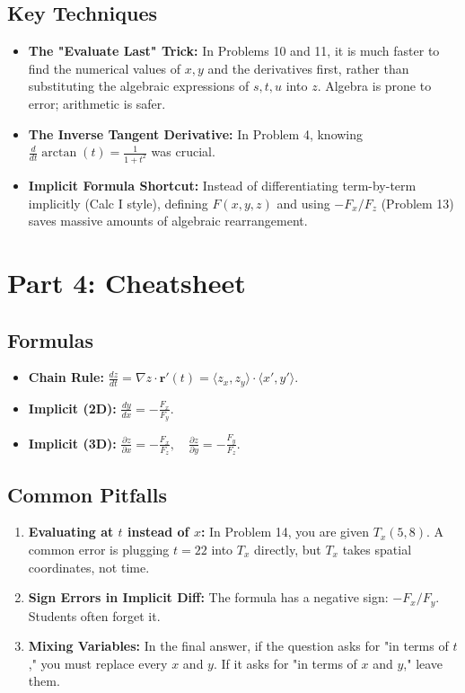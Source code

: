 \documentclass[11pt, letterpaper]{article}
\theoremstyle{definition}
\begin{document}
\subsection{Key Techniques}
\begin{itemize}
    \item \textbf{The "Evaluate Last" Trick:} In Problems 10 and 11, it is much faster to find the numerical values of $x, y$ and the derivatives first, rather than substituting the algebraic expressions of $s,t,u$ into $z$. Algebra is prone to error; arithmetic is safer.
    \item \textbf{The Inverse Tangent Derivative:} In Problem 4, knowing $\frac{d}{dt}\arctan(t) = \frac{1}{1+t^2}$ was crucial.
    \item \textbf{Implicit Formula Shortcut:} Instead of differentiating term-by-term implicitly (Calc I style), defining $F(x,y,z)$ and using $-F_x/F_z$ (Problem 13) saves massive amounts of algebraic rearrangement.
\end{itemize}

\section{Part 4: Cheatsheet}

\subsection{Formulas}
\begin{itemize}
    \item \textbf{Chain Rule:} $\frac{dz}{dt} = \nabla z \cdot \mathbf{r}'(t) = \langle z_x, z_y \rangle \cdot \langle x', y' \rangle$.
    \item \textbf{Implicit (2D):} $\frac{dy}{dx} = -\frac{F_x}{F_y}$.
    \item \textbf{Implicit (3D):} $\frac{\partial z}{\partial x} = -\frac{F_x}{F_z}, \quad \frac{\partial z}{\partial y} = -\frac{F_y}{F_z}$.
\end{itemize}

\subsection{Common Pitfalls}
\begin{enumerate}
    \item \textbf{Evaluating at $t$ instead of $x$:} In Problem 14, you are given $T_x(5,8)$. A common error is plugging $t=22$ into $T_x$ directly, but $T_x$ takes spatial coordinates, not time.
    \item \textbf{Sign Errors in Implicit Diff:} The formula has a negative sign: $-F_x/F_y$. Students often forget it.
    \item \textbf{Mixing Variables:} In the final answer, if the question asks for "in terms of $t$," you must replace every $x$ and $y$. If it asks for "in terms of $x$ and $y$," leave them.
\end{enumerate}
\end{document}
